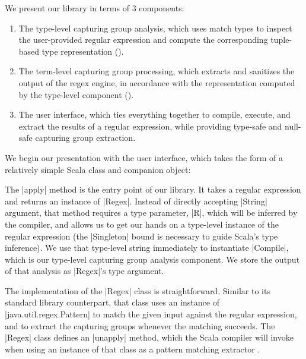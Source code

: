 We present our library in terms of 3 components:

\begin{enumerate}
  \item The type-level capturing group analysis, which uses match types to inspect the user-provided regular expression and compute the corresponding tuple-based type representation ().

  \item The term-level capturing group processing, which extracts and sanitizes the output of the regex engine, in accordance with the representation computed by the type-level component ().

  \item The user interface, which ties everything together to compile, execute, and extract the results of a regular expression, while providing type-safe and null-safe capturing group extraction.
\end{enumerate}

We begin our presentation with the user interface, which takes the form of a relatively simple Scala class and companion object:

\regexUserLevel
%

The |apply| method is the entry point of our library.
It takes a regular expression and returns an instance of |Regex|.
Instead of directly accepting |String| argument, that method requires a type parameter, |R|, which will be inferred by the compiler, and allows us to get our hands on a type-level instance of the regular expression (the |Singleton| bound is necessary to guide Scala's type inference).
We use that type-level string immediately to instantiate |Compile|, which is our type-level capturing group analysis component.
We store the output of that analysis as |Regex|'s type argument.

The implementation of the |Regex| class is straightforward.
Similar to its standard library counterpart, that class uses an instance of |java.util.regex.Pattern| to match the given input against the regular expression, and to extract the capturing groups whenever the matching succeeds.
The |Regex| class defines an |unapply| method, which the Scala compiler will invoke when using an instance of that class as a pattern matching extractor \citep{emir2007matching}.

